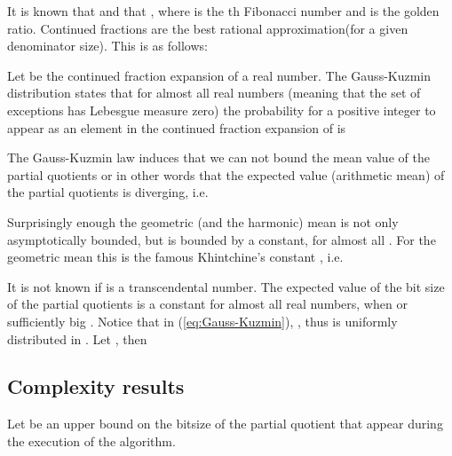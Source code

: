 \documentclass{sig-alternate}
\begin{document}
It is known that  
and that , 
where  is the th Fibonacci number 
and  is the golden ratio.
Continued fractions are the best rational approximation(for a given denominator size).
This is as follows:

Let  be the continued fraction expansion of a real
number. The Gauss-Kuzmin distribution
\cite{BomPoo:contfrac:95}
states that for almost all real numbers  (meaning that the set
of exceptions has Lebesgue measure zero) the probability for a
positive integer  to appear as an element  in the
continued fraction expansion of  is  

The Gauss-Kuzmin law induces that we can not bound the mean value 
of the partial quotients 
or in other words that the expected value (arithmetic mean) of the partial
quotients is diverging, i.e. 


Surprisingly enough the geometric (and the harmonic) mean is not only
asymptotically bounded, but is bounded by a constant, for almost all .
For the geometric mean this is the famous Khintchine's constant
\cite{Khintchine:97}, i.e.

It is not known if  is a transcendental number.
The expected value of the bit size of the partial quotients is a constant
for almost all real numbers, 
when  or  sufficiently big
 \cite{Khintchine:97}.
Notice that in (\ref{eq:Gauss-Kuzmin}), ,
thus  is uniformly distributed in . 
Let , then











\subsection{Complexity results}

Let  be an upper bound on the bitsize of the partial quotient that
appear during the execution of the algorithm.
\end{document}
